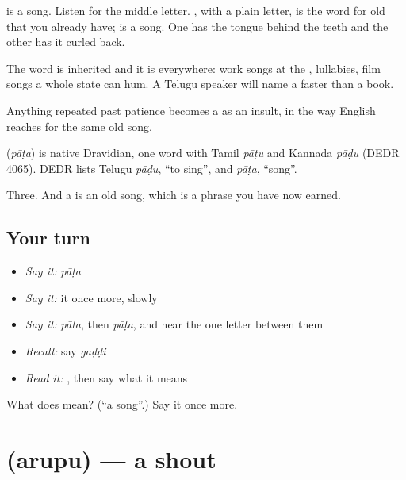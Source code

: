  is a song. Listen for the middle letter. , with a plain letter, is the word for old that you already have;  is a song. One has the tongue behind the teeth and the other has it curled back.

The word is inherited and it is everywhere: work songs at the , lullabies, film songs a whole state can hum. A Telugu speaker will name a  faster than a book.

Anything repeated past patience becomes a  as an insult, in the way English reaches for the same old song.

\begin{cousinweb}
\textbf{} (\emph{pāṭa}) is native Dravidian, one word with Tamil \emph{pāṭu} and Kannada \emph{pāḍu} (DEDR 4065). DEDR lists Telugu \emph{pāḍu}, \textquotedblleft{}to sing\textquotedblright{}, and \emph{pāṭa}, \textquotedblleft{}song\textquotedblright{}.
\end{cousinweb}

\begin{grammarlens}[title={What you've built}]
Three. And a   is an old song, which is a phrase you have now earned.
\end{grammarlens}

\subsection*{Your turn}
\begin{itemize}
\raggedright
  \item \emph{Say it:} \emph{pāṭa}
  \item \emph{Say it:} it once more, slowly
  \item \emph{Say it:} \emph{pāta}, then \emph{pāṭa}, and hear the one letter between them
  \item \emph{Recall:} say \emph{gaḍḍi}
  \item \emph{Read it:} \textbf{}, then say what it means
\end{itemize}

\begin{tcolorbox}[breakable,colback=teal!4,colframe=teal!35!black,title={Before you move on}]
What does  mean? (\textquotedblleft{}a song\textquotedblright{}.) Say it once more.
\end{tcolorbox}
\section[\texorpdfstring{\te{అరుపు} (arupu)}{అరుపు (arupu)}]{ (arupu) — a shout}

